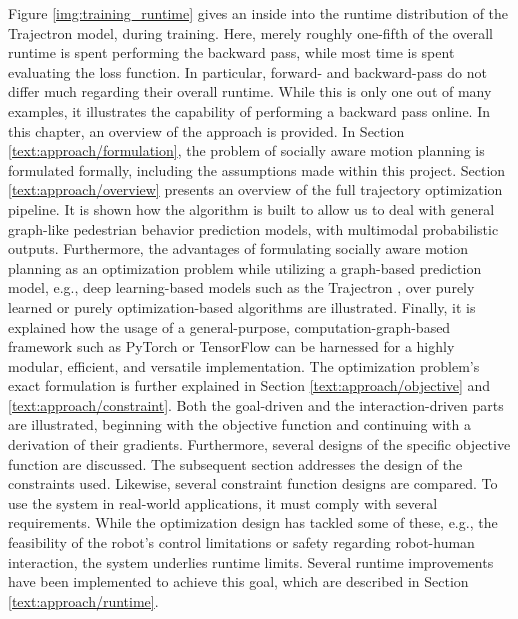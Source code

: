 Figure \ref{img:training_runtime} gives an inside into the runtime distribution of the Trajectron model, during training. Here, merely roughly one-fifth of the overall runtime is spent performing the backward pass, while most time is spent evaluating the loss function. In particular, forward- and backward-pass do not differ much regarding their overall runtime. While this is only one out of many examples, it illustrates the capability of performing a backward pass online.  
\newline\newline
In this chapter, an overview of the approach is provided. In Section \ref{text:approach/formulation}, the problem of socially aware motion planning is formulated formally, including the assumptions made within this project. 
\newline
Section \ref{text:approach/overview} presents an overview of the full trajectory optimization pipeline. It is shown how the algorithm is built to allow us to deal with general graph-like pedestrian behavior prediction models, with multimodal  probabilistic outputs. Furthermore, the advantages of formulating socially aware motion planning as an optimization problem while utilizing a graph-based prediction model, e.g., deep learning-based models such as the Trajectron \cite{Ivanovic2018}, over purely learned \cite{Chen2017} or purely optimization-based \cite{vandenBerg2011} algorithms are illustrated. Finally, it is explained how the usage of a general-purpose, computation-graph-based framework such as PyTorch \cite{pytorch} or TensorFlow \cite{tensorflow} can be harnessed for a highly modular, efficient, and versatile implementation.
\newline
The optimization problem's exact formulation is further explained in Section \ref{text:approach/objective} and \ref{text:approach/constraint}. Both the goal-driven and the interaction-driven parts are illustrated, beginning with the objective function and continuing with a derivation of their gradients. Furthermore, several designs of the specific objective function are discussed. The subsequent section addresses the design of the constraints used. Likewise, several constraint function designs are compared. 
\newline
To use the system in real-world applications, it must comply with several requirements. While the optimization design has tackled some of these, e.g., the feasibility of the robot's control limitations or safety regarding robot-human interaction, the system underlies runtime limits. Several runtime improvements have been implemented to achieve this goal, which are described in Section \ref{text:approach/runtime}.

